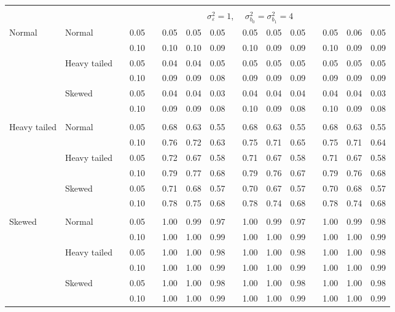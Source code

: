 \begin{table}[ht]
\begin{scriptsize}
\begin{tabular}{ll p{.1cm} c p{.1cm} rrr p{.1cm} rrr p{.1cm} rrr}
&&&&&&&&&&&&&&&\\
& && && \multicolumn{9}{c}{$\sigma_{\varepsilon}^2 = 1$, \ \ $\sigma_{b_0}^2 = \sigma_{b_1}^2 = 4$} \\ \cline{6-16}

\rowcolor{gray!20}Normal       & Normal       && 0.05 &&   0.05 & 0.05 & 0.05 && 0.05 & 0.05 & 0.05 && 0.05 & 0.06 & 0.05 \\ 
\rowcolor{gray!20}             &              && 0.10 &&   0.10 & 0.10 & 0.09 && 0.10 & 0.09 & 0.09 && 0.10 & 0.09 & 0.09 \\ 
\rowcolor{gray!20}             & Heavy tailed && 0.05 &&   0.04 & 0.04 & 0.05 && 0.05 & 0.05 & 0.05 && 0.05 & 0.05 & 0.05 \\ 
\rowcolor{gray!20}             &              && 0.10 &&   0.09 & 0.09 & 0.08 && 0.09 & 0.09 & 0.09 && 0.09 & 0.09 & 0.09 \\ 
\rowcolor{gray!20}             & Skewed       && 0.05 &&   0.04 & 0.04 & 0.03 && 0.04 & 0.04 & 0.04 && 0.04 & 0.04 & 0.03 \\ 
\rowcolor{gray!20}             &              && 0.10 &&   0.09 & 0.09 & 0.08 && 0.10 & 0.09 & 0.08 && 0.10 & 0.09 & 0.08 \\ 
             &&&&&&&&&&&&&&&\\
Heavy tailed & Normal       && 0.05 &&   0.68 & 0.63 & 0.55 && 0.68 & 0.63 & 0.55 && 0.68 & 0.63 & 0.55 \\ 
             &              && 0.10 &&   0.76 & 0.72 & 0.63 && 0.75 & 0.71 & 0.65 && 0.75 & 0.71 & 0.64 \\ 
             & Heavy tailed && 0.05 &&   0.72 & 0.67 & 0.58 && 0.71 & 0.67 & 0.58 && 0.71 & 0.67 & 0.58 \\ 
             &              && 0.10 &&   0.79 & 0.77 & 0.68 && 0.79 & 0.76 & 0.67 && 0.79 & 0.76 & 0.68 \\ 
             & Skewed       && 0.05 &&   0.71 & 0.68 & 0.57 && 0.70 & 0.67 & 0.57 && 0.70 & 0.68 & 0.57 \\ 
             &              && 0.10 &&   0.78 & 0.75 & 0.68 && 0.78 & 0.74 & 0.68 && 0.78 & 0.74 & 0.68 \\ 
             &&&&&&&&&&&&&&&\\
Skewed       & Normal       && 0.05 &&   1.00 & 0.99 & 0.97 && 1.00 & 0.99 & 0.97 && 1.00 & 0.99 & 0.98 \\ 
             &              && 0.10 &&   1.00 & 1.00 & 0.99 && 1.00 & 1.00 & 0.99 && 1.00 & 1.00 & 0.99 \\ 
             & Heavy tailed && 0.05 &&   1.00 & 1.00 & 0.98 && 1.00 & 1.00 & 0.98 && 1.00 & 1.00 & 0.98 \\ 
             &              && 0.10 &&   1.00 & 1.00 & 0.99 && 1.00 & 1.00 & 0.99 && 1.00 & 1.00 & 0.99 \\ 
             & Skewed       && 0.05 &&   1.00 & 1.00 & 0.98 && 1.00 & 1.00 & 0.98 && 1.00 & 1.00 & 0.98 \\ 
             &              && 0.10 &&   1.00 & 1.00 & 0.99 && 1.00 & 1.00 & 0.99 && 1.00 & 1.00 & 0.99 \\ 



\end{tabular}
\end{scriptsize}
\end{table}
